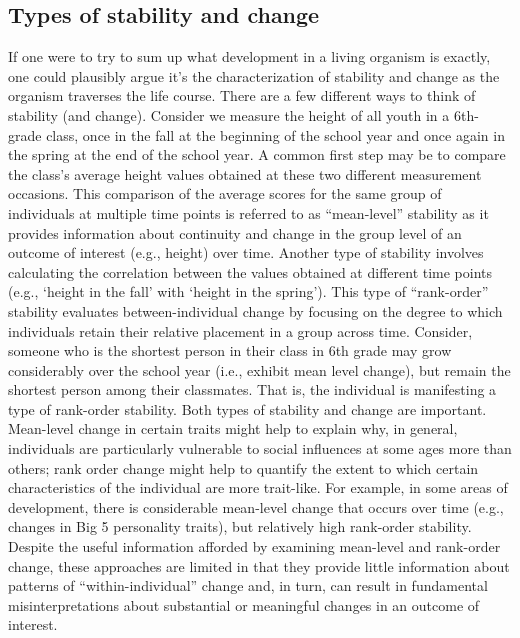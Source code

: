 \documentclass[
  letterpaper,
  DIV=11,
  numbers=noendperiod]{scrartcl}
\begin{document}
\hypertarget{types-of-stability-and-change}{%
\subsection{Types of stability and
change}\label{types-of-stability-and-change}}

If one were to try to sum up what development in a living organism is
exactly, one could plausibly argue it's the characterization of
stability and change as the organism traverses the life course. There
are a few different ways to think of stability (and change). Consider we
measure the height of all youth in a 6th-grade class, once in the fall
at the beginning of the school year and once again in the spring at the
end of the school year. A common first step may be to compare the
class's average height values obtained at these two different
measurement occasions. This comparison of the average scores for the
same group of individuals at multiple time points is referred to as
``mean-level'' stability as it provides information about continuity and
change in the group level of an outcome of interest (e.g., height) over
time. Another type of stability involves calculating the correlation
between the values obtained at different time points (e.g., `height in
the fall' with `height in the spring'). This type of ``rank-order''
stability evaluates between-individual change by focusing on the degree
to which individuals retain their relative placement in a group across
time. Consider, someone who is the shortest person in their class in 6th
grade may grow considerably over the school year (i.e., exhibit mean
level change), but remain the shortest person among their classmates.
That is, the individual is manifesting a type of rank-order stability.
Both types of stability and change are important. Mean-level change in
certain traits might help to explain why, in general, individuals are
particularly vulnerable to social influences at some ages more than
others; rank order change might help to quantify the extent to which
certain characteristics of the individual are more trait-like. For
example, in some areas of development, there is considerable mean-level
change that occurs over time (e.g., changes in Big 5 personality
traits), but relatively high rank-order stability. Despite the useful
information afforded by examining mean-level and rank-order change,
these approaches are limited in that they provide little information
about patterns of ``within-individual'' change and, in turn, can result
in fundamental misinterpretations about substantial or meaningful
changes in an outcome of interest.
\end{document}
